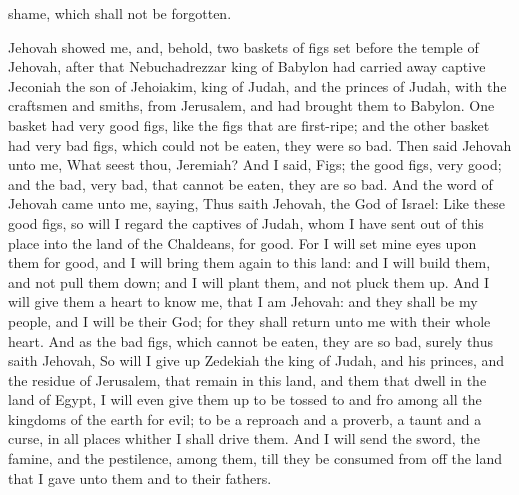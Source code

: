 shame, which shall not be forgotten. 

Jehovah showed me, and, behold, two baskets of figs set before the temple of Jehovah, after that Nebuchadrezzar king of Babylon had carried away captive Jeconiah the son of Jehoiakim, king of Judah, and the princes of Judah, with the craftsmen and smiths, from Jerusalem, and had brought them to Babylon. One basket had very good figs, like the figs that are first-ripe; and the other basket had very bad figs, which could not be eaten, they were so bad. Then said Jehovah unto me, What seest thou, Jeremiah? And I said, Figs; the good figs, very good; and the bad, very bad, that cannot be eaten, they are so bad.  And the word of Jehovah came unto me, saying, Thus saith Jehovah, the God of Israel: Like these good figs, so will I regard the captives of Judah, whom I have sent out of this place into the land of the Chaldeans, for good. For I will set mine eyes upon them for good, and I will bring them again to this land: and I will build them, and not pull them down; and I will plant them, and not pluck them up. And I will give them a heart to know me, that I am Jehovah: and they shall be my people, and I will be their God; for they shall return unto me with their whole heart.  And as the bad figs, which cannot be eaten, they are so bad, surely thus saith Jehovah, So will I give up Zedekiah the king of Judah, and his princes, and the residue of Jerusalem, that remain in this land, and them that dwell in the land of Egypt, I will even give them up to be tossed to and fro among all the kingdoms of the earth for evil; to be a reproach and a proverb, a taunt and a curse, in all places whither I shall drive them. And I will send the sword, the famine, and the pestilence, among them, till they be consumed from off the land that I gave unto them and to their fathers. 

